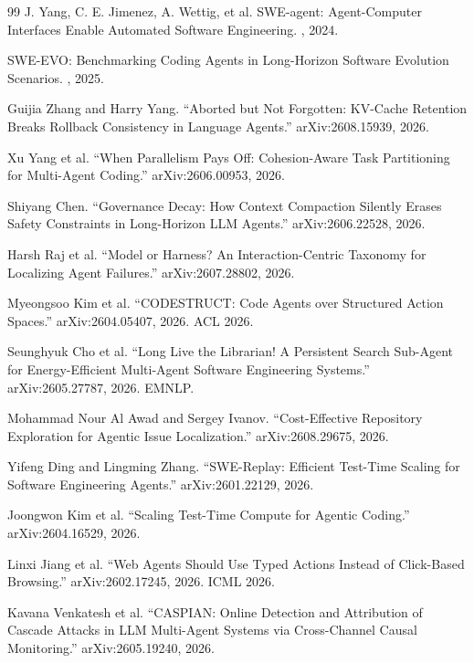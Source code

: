 \begin{thebibliography}{99}
J. Yang, C. E. Jimenez, A. Wettig, et al.
\newblock SWE-agent: Agent-Computer Interfaces Enable Automated Software Engineering.
, 2024.

\newblock SWE-EVO: Benchmarking Coding Agents in Long-Horizon Software Evolution Scenarios.
, 2025.

Guijia Zhang and Harry Yang.
``Aborted but Not Forgotten: KV-Cache Retention Breaks Rollback Consistency in Language Agents.''
arXiv:2608.15939, 2026.

Xu Yang et al.
``When Parallelism Pays Off: Cohesion-Aware Task Partitioning for Multi-Agent Coding.''
arXiv:2606.00953, 2026.

Shiyang Chen.
``Governance Decay: How Context Compaction Silently Erases Safety Constraints in Long-Horizon LLM Agents.''
arXiv:2606.22528, 2026.

Harsh Raj et al.
``Model or Harness? An Interaction-Centric Taxonomy for Localizing Agent Failures.''
arXiv:2607.28802, 2026.

Myeongsoo Kim et al.
``CODESTRUCT: Code Agents over Structured Action Spaces.''
arXiv:2604.05407, 2026. ACL 2026.

Seunghyuk Cho et al.
``Long Live the Librarian! A Persistent Search Sub-Agent for Energy-Efficient Multi-Agent Software Engineering Systems.''
arXiv:2605.27787, 2026. EMNLP.

Mohammad Nour Al Awad and Sergey Ivanov.
``Cost-Effective Repository Exploration for Agentic Issue Localization.''
arXiv:2608.29675, 2026.

Yifeng Ding and Lingming Zhang.
``SWE-Replay: Efficient Test-Time Scaling for Software Engineering Agents.''
arXiv:2601.22129, 2026.

Joongwon Kim et al.
``Scaling Test-Time Compute for Agentic Coding.''
arXiv:2604.16529, 2026.

Linxi Jiang et al.
``Web Agents Should Use Typed Actions Instead of Click-Based Browsing.''
arXiv:2602.17245, 2026. ICML 2026.

Kavana Venkatesh et al.
``CASPIAN: Online Detection and Attribution of Cascade Attacks in LLM Multi-Agent Systems via Cross-Channel Causal Monitoring.''
arXiv:2605.19240, 2026.


\end{thebibliography}

